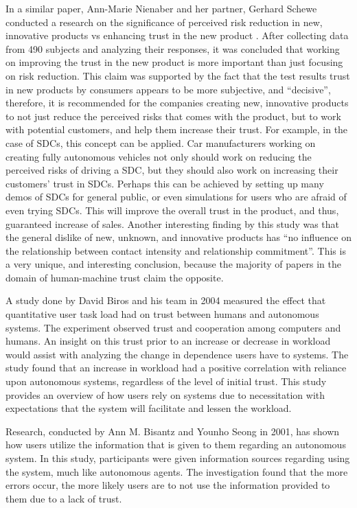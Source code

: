 \documentclass[runningheads,a4paper]{llncs}
\begin{document}
In a similar paper, Ann-Marie Nienaber and her partner, Gerhard Schewe conducted a research on the significance of perceived risk reduction in new, innovative products vs enhancing trust in the new product \cite{nienaber2014enhancing}. After collecting data from 490 subjects and analyzing their responses, it was concluded that working on improving the trust in the new product is more important than just focusing on risk reduction. This claim was supported by the fact that the test results trust in new products by consumers appears to be more subjective, and ``decisive'', therefore, it is recommended for the companies creating new, innovative products to not just reduce the perceived risks that comes with the product, but to work with potential customers, and help them increase their trust. For example, in the case of SDCs, this concept can be applied. Car manufacturers working on creating fully autonomous vehicles not only should work on reducing the perceived risks of driving a SDC, but they should also work on increasing their customers' trust in SDCs. Perhaps this can be achieved by setting up many demos of SDCs for general public, or even simulations for users who are afraid of even trying SDCs. This will improve the overall trust in the product, and thus, guaranteed increase of sales. Another interesting finding by this study was that the general dislike of new, unknown, and innovative products has ``no influence on the
relationship between contact intensity and relationship commitment''. This is a very unique, and interesting conclusion, because the majority of papers in the domain of human-machine trust claim the opposite.

A study done by David Biros and his team in 2004 measured the effect that quantitative user task load had on trust between humans and autonomous systems\cite{biros2004influence}.  The experiment observed trust and cooperation among computers and humans.  An insight on this trust prior to an increase or decrease in workload would assist with analyzing the change in dependence users have to systems.  The study found that an increase in workload had a positive correlation with reliance upon autonomous systems, regardless of the level of initial trust.  This study provides an overview of how users rely on systems due to necessitation with expectations that the system will facilitate and lessen the workload.

Research, conducted by Ann M.  Bisantz and Younho Seong in 2001, has shown how users utilize the information that is given to them regarding an autonomous system\cite{bisantz2001assessment}.  In this study, participants were given information sources regarding using the system, much like autonomous agents.  The investigation found that the more errors occur, the more likely users are to not use the information provided to them due to a lack of trust.  
\end{document}
